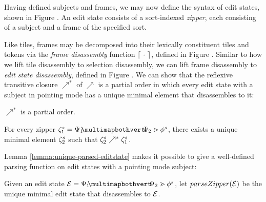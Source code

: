 Having defined subjects and frames, we may now
define the syntax of edit states,
shown in Figure .
An edit state consists of a sort-indexed \emph{zipper},
each consisting of a subject and a frame of the
specified sort.

Like tiles, frames may be decomposed into their
lexically constituent tiles and tokens via the
\emph{frame disassembly} function $\left\lceil~\cdot~\right\rceil$,
defined in Figure .
Similar to how we lift tile disassembly to selection
disassembly, we can lift frame disassembly to
\emph{edit state disassembly}, defined in Figure .
We can show that the reflexive transitive closure
$\nearrow^*$ of $\nearrow$ is a partial order in
which every edit state with a subject in pointing mode
has a unique minimal element that disassembles to it:
\begin{lemma}
  $\nearrow^*$ is a partial order.
\end{lemma}
\begin{lemma}\label{lemma:unique-parsed-editstate}
  For every zipper $\zip^s_1 = \zipper{\pointing{\selection_1}{\selection_2}}{\tfrelem^s}$, there exists
  a unique minimal element $\zeta^s_2$ such that $\zeta^s_2 \nearrow^* \zeta^s_1$.
\end{lemma}

Lemma \ref{lemma:unique-parsed-editstate} makes it
possible to give a well-defined parsing function
on edit states with a pointing mode subject:

\begin{definition}
  Given an edit state $\editState = \zipper{\pointing{\selection_1}{\selection_2}}{\tfrelem^s}$,
  let $parseZipper(\mathcal{E})$ be the unique minimal edit state
  that disassembles to $\mathcal{E}$.
\end{definition}









% 






